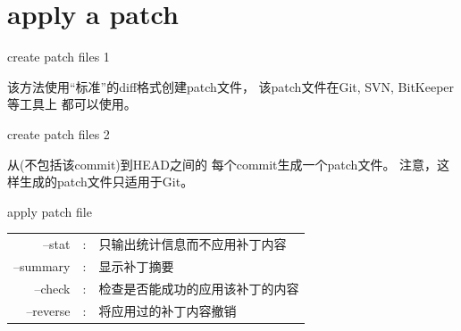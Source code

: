﻿\documentclass{beamer}
\begin{document}
\section[apply a patch]{apply a patch}
\begin{frame}{create patch files 1}
\vspace{1em}
\begin{center}
\begin{minipage}{0.7\textwidth}
  \ttfamily
  该方法使用“标准”的diff格式创建patch文件，
  该patch文件在Git, SVN, BitKeeper等工具上
  都可以使用。
\end{minipage}
\end{center}
\end{frame}

\begin{frame}{create patch files 2}
\vspace{1em}
\begin{center}
\begin{minipage}{0.7\textwidth}
  \ttfamily
  从(不包括该commit)到HEAD之间的
  每个commit生成一个patch文件。
  注意，这样生成的patch文件只适用于Git。
\end{minipage}
\end{center}
\end{frame}

\begin{frame}{apply patch file}
\begin{center}
{\ttfamily
  \begin{tabular}{rcl}
    --stat&:&只输出统计信息而不应用补丁内容\\
    --summary&:&显示补丁摘要\\
    --check&:&检查是否能成功的应用该补丁的内容\\
    --reverse&:&将应用过的补丁内容撤销\\
  \end{tabular}
}
\end{center}
\end{frame}
\end{document}
